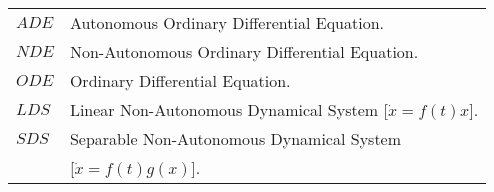 
\begin{tabular}{ll}
  $ADE$ \hspace{1cm} & Autonomous Ordinary Differential Equation. \\
  $NDE$ \hspace{1cm} & Non-Autonomous Ordinary Differential Equation. \\
  $ODE$ \hspace{1cm} & Ordinary Differential Equation. \\
  $LDS$ \hspace{1cm} & Linear Non-Autonomous Dynamical System [$\dot{x} =
                 f(t)x$]. \\
  $SDS$ \hspace{1cm} & Separable Non-Autonomous Dynamical System \\
                     & \hspace{3cm} [$\dot{x} =
                 f(t)g(x)$]. \\
\end{tabular}
